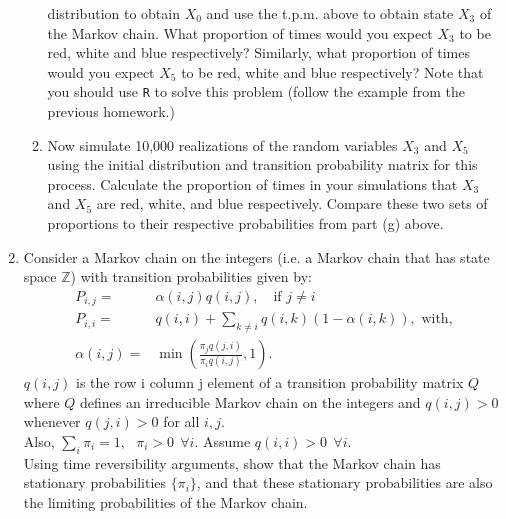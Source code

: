 \documentclass[12pt]{article}
\begin{document}
\begin{enumerate}
\begin{enumerate}
  distribution to obtain $X_0$ and use the t.p.m. above to obtain
  state $X_3$ of the Markov chain. What proportion of times would you
  expect $X_3$ to be red, white and blue respectively? Similarly, what
  proportion of times would you expect $X_5$ to be red, white and blue
  respectively? Note that you should use {\tt R} to solve this problem
  (follow the example from the previous homework.)
\item Now simulate 10,000 realizations of the random variables $X_3$
  and $X_5$ using the initial distribution and transition probability
  matrix for this process. Calculate the proportion of times in your
  simulations that $X_3$ and $X_5$ are red, white, and blue
  respectively. Compare these two sets of proportions to their
  respective probabilities from part (g) above.
\end{enumerate} 
\item Consider a Markov chain on the integers (i.e. a Markov chain that has state space 
$\mathbb{Z}$) with transition probabilities given by: %
\begin{equation*}
  \begin{split}
    P_{i,j}= & \alpha(i,j) q(i,j), \:\:\: \mbox{ if } j \neq i \\
    P_{i,i}= & q(i,i) + \sum_{k\neq i} q(i,k)(1-\alpha(i,k)), \mbox{  with,}\\
    \alpha(i,j) = & \min\left(\frac{\pi_jq(j,i)}{\pi_iq(i,j)}, 1\right).
  \end{split}
\end{equation*}
$q(i,j)$ is the row i column j element of a transition probability
matrix $Q$ where $Q$ defines an irreducible Markov chain on the
integers and $q(i,j)>0$ whenever $q(j,i)>0$ for all $i,j$. \\Also,
$\sum_i \pi_i=1,\:\:\:
\pi_i > 0 \:\: \forall i$. Assume $q(i,i)>0 \:\: \forall i$.\\
Using time reversibility arguments, show that the Markov chain has
stationary probabilities $\{\pi_i\}$, and that these stationary
probabilities are also the limiting probabilities of the Markov chain.
\end{enumerate}
\end{document}
